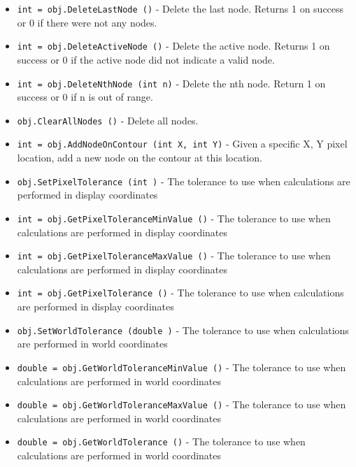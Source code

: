 \begin{itemize}
\item  \verb|int = obj.DeleteLastNode ()| -  Delete the last node. Returns 1 on success or 0 if 
 there were not any nodes.

\item  \verb|int = obj.DeleteActiveNode ()| -  Delete the active node. Returns 1 on success or 0 if
 the active node did not indicate a valid node.

\item  \verb|int = obj.DeleteNthNode (int n)| -  Delete the nth node. Return 1 on success or 0 if n
 is out of range.

\item  \verb|obj.ClearAllNodes ()| -  Delete all nodes. 

\item  \verb|int = obj.AddNodeOnContour (int X, int Y)| -  Given a specific X, Y pixel location, add a new node 
 on the contour at this location. 

\item  \verb|obj.SetPixelTolerance (int )| -  The tolerance to use when calculations are performed in 
 display coordinates

\item  \verb|int = obj.GetPixelToleranceMinValue ()| -  The tolerance to use when calculations are performed in 
 display coordinates

\item  \verb|int = obj.GetPixelToleranceMaxValue ()| -  The tolerance to use when calculations are performed in 
 display coordinates

\item  \verb|int = obj.GetPixelTolerance ()| -  The tolerance to use when calculations are performed in 
 display coordinates

\item  \verb|obj.SetWorldTolerance (double )| -  The tolerance to use when calculations are performed in
 world coordinates

\item  \verb|double = obj.GetWorldToleranceMinValue ()| -  The tolerance to use when calculations are performed in
 world coordinates

\item  \verb|double = obj.GetWorldToleranceMaxValue ()| -  The tolerance to use when calculations are performed in
 world coordinates

\item  \verb|double = obj.GetWorldTolerance ()| -  The tolerance to use when calculations are performed in
 world coordinates


\end{itemize}
